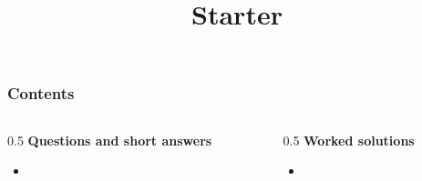 \documentclass[aspectratio=169]{beamer}
\title{Starter}
\author{}
\date{}
\begin{document}
\frame{\titlepage}

\begin{frame}
  \frametitle{Contents}
  \small
  \begin{columns}[T]
    \begin{column}{0.5\textwidth}
      \textbf{Questions and short answers}
      \begin{itemize}
        \item \hyperlink{q-st1}{}
      \end{itemize}
    \end{column}
    \begin{column}{0.5\textwidth}
      \textbf{Worked solutions}
      \begin{itemize}
        \item \hyperlink{work-st1}{}
      \end{itemize}
    \end{column}
  \end{columns}
\end{frame}
\end{document}
